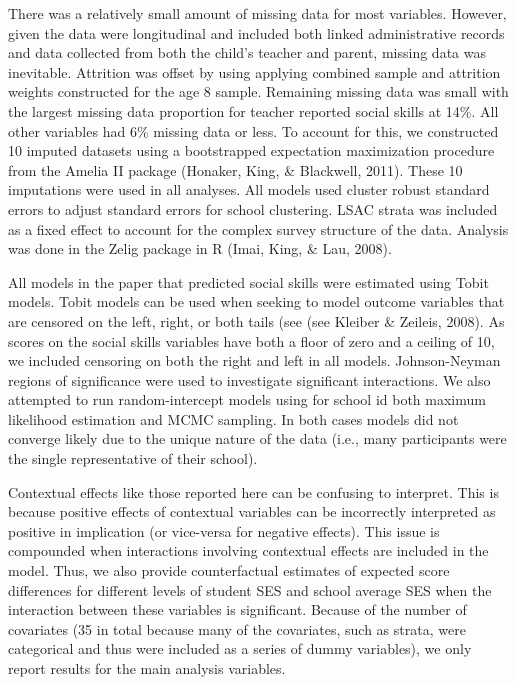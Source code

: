 \documentclass[
  english,
  man]{apa6}
\begin{document}
There was a relatively small amount of missing data for most variables. However, given the data were longitudinal and included both linked administrative records and data collected from both the child's teacher and parent, missing data was inevitable. Attrition was offset by using applying combined sample and attrition weights constructed for the age 8 sample. Remaining missing data was small with the largest missing data proportion for teacher reported social skills at 14\%. All other variables had 6\% missing data or less. To account for this, we constructed 10 imputed datasets using a bootstrapped expectation maximization procedure from the Amelia II package (Honaker, King, \& Blackwell, 2011). These 10 imputations were used in all analyses. All models used cluster robust standard errors to adjust standard errors for school clustering. LSAC strata was included as a fixed effect to account for the complex survey structure of the data. Analysis was done in the Zelig package in R (Imai, King, \& Lau, 2008).

All models in the paper that predicted social skills were estimated using Tobit models. Tobit models can be used when seeking to model outcome variables that are censored on the left, right, or both tails (see (see Kleiber \& Zeileis, 2008). As scores on the social skills variables have both a floor of zero and a ceiling of 10, we included censoring on both the right and left in all models. Johnson-Neyman regions of significance were used to investigate significant interactions. We also attempted to run random-intercept models using for school id both maximum likelihood estimation and MCMC sampling. In both cases models did not converge likely due to the unique nature of the data (i.e., many participants were the single representative of their school).

Contextual effects like those reported here can be confusing to interpret. This is because positive effects of contextual variables can be incorrectly interpreted as positive in implication (or vice-versa for negative effects). This issue is compounded when interactions involving contextual effects are included in the model. Thus, we also provide counterfactual estimates of expected score differences for different levels of student SES and school average SES when the interaction between these variables is significant. Because of the number of covariates (35 in total because many of the covariates, such as strata, were categorical and thus were included as a series of dummy variables), we only report results for the main analysis variables.
\end{document}
